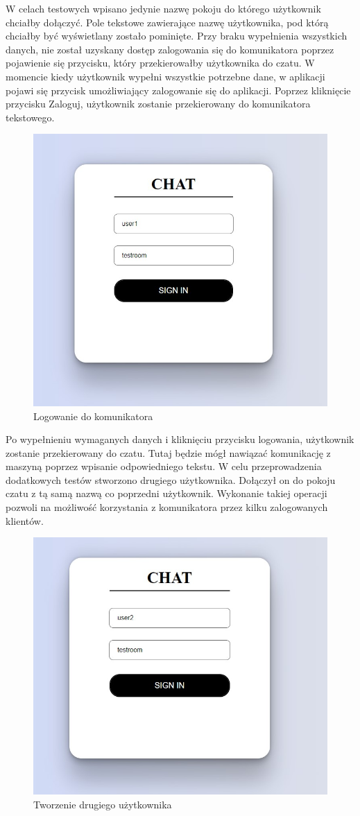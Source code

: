 \newpage
W celach testowych wpisano jedynie nazwę pokoju do którego użytkownik chciałby dołączyć. Pole tekstowe zawierające nazwę użytkownika, pod którą chciałby być wyświetlany zostało pominięte. Przy braku wypełnienia wszystkich danych, nie został uzyskany dostęp zalogowania się do komunikatora poprzez pojawienie się przycisku, który przekierowałby użytkownika do czatu.
W momencie kiedy użytkownik wypełni wszystkie potrzebne dane, w aplikacji pojawi się przycisk umożliwiający zalogowanie się do aplikacji. Poprzez kliknięcie przycisku Zaloguj, użytkownik zostanie przekierowany do komunikatora tekstowego.

\begin{figure}[htbp]
	\centering
	\includegraphics[width=0.5\linewidth]{"obrazy/TESTdolaczenie"}
	\caption{Logowanie do komunikatora}
	\label{fig:41}
\end{figure}
Po wypełnieniu wymaganych danych i kliknięciu przycisku logowania, użytkownik zostanie przekierowany do czatu. Tutaj będzie mógł nawiązać komunikację z maszyną poprzez wpisanie odpowiedniego tekstu.
W celu przeprowadzenia dodatkowych testów stworzono drugiego użytkownika. Dołączył on do pokoju czatu z tą samą nazwą co poprzedni użytkownik. Wykonanie takiej operacji pozwoli na możliwość korzystania z komunikatora przez kilku zalogowanych klientów.
\newpage
\begin{figure}[htbp]
	\centering
	\includegraphics[width=0.5\linewidth]{"obrazy/TEST2uzytkownik"}
	\caption{Tworzenie drugiego użytkownika}
	\label{fig:43}
\end{figure}
